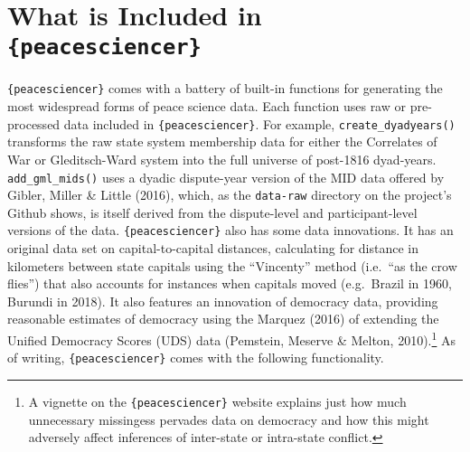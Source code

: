 \documentclass[
  11pt,
]{article}
\begin{document}
\hypertarget{what-is-included-in-peacesciencer}{%
\section{\texorpdfstring{What is Included in \texttt{\{peacesciencer\}}}{What is Included in \{peacesciencer\}}}\label{what-is-included-in-peacesciencer}}

\texttt{\{peacesciencer\}} comes with a battery of built-in functions for generating the most widespread forms of peace science data. Each function uses raw or pre-processed data included in \texttt{\{peacesciencer\}}. For example, \texttt{create\_dyadyears()} transforms the raw state system membership data for either the Correlates of War or Gleditsch-Ward system into the full universe of post-1816 dyad-years. \texttt{add\_gml\_mids()} uses a dyadic dispute-year version of the MID data offered by Gibler, Miller \& Little (2016), which, as the \texttt{data-raw} directory on the project's Github shows, is itself derived from the dispute-level and participant-level versions of the data. \texttt{\{peacesciencer\}} also has some data innovations. It has an original data set on capital-to-capital distances, calculating for distance in kilometers between state capitals using the ``Vincenty'' method (i.e.~``as the crow flies'') that also accounts for instances when capitals moved (e.g.~Brazil in 1960, Burundi in 2018). It also features an innovation of democracy data, providing reasonable estimates of democracy using the Marquez (2016) of extending the Unified Democracy Scores (UDS) data (Pemstein, Meserve \& Melton, 2010).\footnote{A vignette on the \texttt{\{peacesciencer\}} website explains just how much unnecessary missingess pervades data on democracy and how this might adversely affect inferences of inter-state or intra-state conflict.} As of writing, \texttt{\{peacesciencer\}} comes with the following functionality.

\begingroup\fontsize{7}{9}\selectfont
\end{document}
